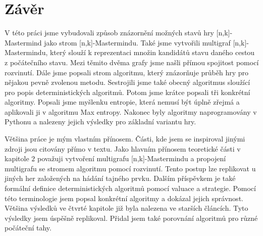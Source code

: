 \chapter*{Závěr}

V této práci jsme vybudovali způsob znázornění možných stavů hry [n,k]-Mastermind jako strom [n,k]-Mastermindu. Také jsme vytvořili multigraf [n,k]-Mastermindu, který slouží k reprezentaci množin kandidátů stavu daného cestou z počátečního stavu. Mezi těmito dvěma grafy jsme našli přímou spojitost pomocí rozvinutí. Dále jsme popsali strom algoritmu, který znázorňuje průběh hry pro nějakou pevně zvolenou metodu. Sestrojili jsme také obecný algoritmus sloužící pro popis deterministických algoritmů. Potom jsme krátce popsali tři konkrétní algoritmy. Popsali jsme myšlenku entropie, která nemusí být úplně zřejmá a aplikovali ji v algoritmu Max entropy. Nakonec byly algoritmy naprogramovány v Pythonu a nalezeny jejich výsledky pro základní variantu hry. 

Většina práce je mým vlastním přínosem. Části, kde jsem se inspiroval jinými zdroji jsou citovány přímo v textu. Jako hlavním přínosem teoretické části v kapitole $2$ považuji vytvoření multigrafu [n,k]-Mastermindu a propojení multigrafu se stromem algoritmu pomocí rozvinutí. Tento postup lze replikovat u jiných her založených na hádání tajného prvku. Dalším příspěvkem je také formální definice deterministických algoritmů pomocí valuace a strategie. Pomocí této terminologie jsem popsal konkrétní algoritmy a dokázal jejich správnost. Většina výsledků ve čtvrté kapitole již byla nalezena ve starších článcích. Tyto výsledky jsem úspěšně replikoval. Přidal jsem také porovnání algoritmů pro různé počáteční tahy. 



